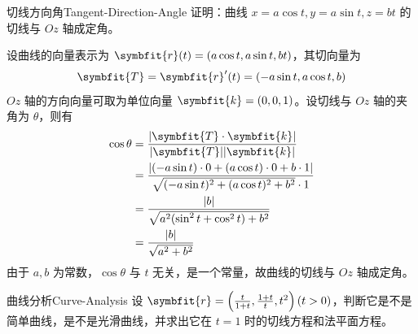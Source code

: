\begin{problem}{切线方向角}{Tangent-Direction-Angle}
    证明：曲线 $x = a \cos t, y = a \sin t, z = b t$ 的切线与 $Oz$ 轴成定角。
\end{problem}

\begin{myproof}
    设曲线的向量表示为 $\symbfit{r}(t) = (a \cos t, a \sin t, bt)$，其切向量为
    \begin{equation}
        \symbfit{T} = \symbfit{r}'(t) = (-a \sin t, a \cos t, b)
    \end{equation}
    $Oz$ 轴的方向向量可取为单位向量 $\symbfit{k} = (0, 0, 1)$。设切线与 $Oz$ 轴的夹角为 $\theta$，则有
    \begin{equation}
        \begin{aligned}
            \cos \theta & = \frac{|\symbfit{T} \cdot \symbfit{k}|}{|\symbfit{T}| |\symbfit{k}|}                                              \\
                        & = \frac{|(-a \sin t) \cdot 0 + (a \cos t) \cdot 0 + b \cdot 1|}{\sqrt{(-a \sin t)^2 + (a \cos t)^2 + b^2} \cdot 1} \\
                        & = \frac{|b|}{\sqrt{a^2(\sin^2 t + \cos^2 t) + b^2}}                                                                \\
                        & = \frac{|b|}{\sqrt{a^2 + b^2}}
        \end{aligned}
    \end{equation}
    由于 $a, b$ 为常数，$\cos \theta$ 与 $t$ 无关，是一个常量，故曲线的切线与 $Oz$ 轴成定角。
\end{myproof}


\begin{problem}{曲线分析}{Curve-Analysis}
    设 $\symbfit{r} = \left(\frac{t}{1+t}, \frac{1+t}{t}, t^2\right) (t > 0)$，判断它是不是简单曲线，是不是光滑曲线，并求出它在 $t = 1$ 时的切线方程和法平面方程。
\end{problem}

